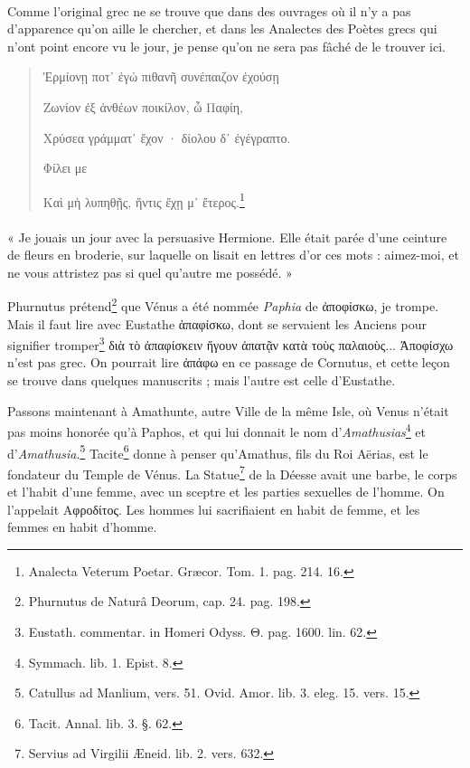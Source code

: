 \documentclass[a4paper, 11pt, oneside, polutonikogreek, french]{article}
\begin{document}
\paragraph{}
Comme l'original grec ne se trouve que dans des ouvrages où il n'y a pas d'apparence qu'on aille le chercher, et dans les Analectes des Poètes grecs qui n'ont point encore vu le jour, je pense qu'on ne sera pas fâché de le trouver ici.
\begin{quotation}
Ἑρμίονῃ ποτ᾿ ἐγώ πιθανῆ συνέπαιζον ἐχούσῃ

\hspace*{5mm}Ζωνίον ἐξ ἀνθέων ποικίλον, ὦ Παφίη,

Χρύσεα γράμματ᾽ ἔχον · δίολου δ᾽ ἐγέγραπτο.

\hspace*{5mm}Φίλει με

\hspace*{5mm}Καὶ μὴ λυπηθῇς, ἥντις ἔχῃ μ᾿ ἕτερος.\footnote{Analecta Veterum Poetar. Græcor. Tom. 1. pag. 214. 16.}
\end{quotation}
\paragraph{}

« Je jouais un jour avec la persuasive Hermione. Elle était parée d'une ceinture de fleurs en broderie, sur laquelle on lisait en lettres d'or ces mots : aimez-moi, et ne vous attristez pas si quel qu'autre me possédé. »

Phurnutus prétend\footnote{Phurnutus de Naturâ Deorum, cap. 24. pag. 198.} que Vénus a été nommée \emph{Paphia} de ἀποφίσκω, je trompe. Mais il faut lire avec Eustathe ἀπαφίσκω, dont se servaient les Anciens pour signifier tromper\footnote{Eustath. commentar. in Homeri Odyss. Θ. pag. 1600. lin. 62.} διὰ τὸ ἀπαφίσκειν ἤγουν ἀπατᾷν κατὰ τοὺς παλαιοὺς... Ἀποφίσχω n'est pas grec. On pourrait lire ἀπάφω en ce passage de Cornutus, et cette leçon se trouve dans quelques manuscrits ; mais l'autre est celle d'Eustathe.

Passons maintenant à Amathunte, autre Ville de la même Isle, où Venus n'était pas moins honorée qu'à Paphos, et qui lui donnait le nom d'\emph{Amathusias}\footnote{Symmach. lib. 1. Epist. 8.} et d'\emph{Amathusia}.\footnote{Catullus ad Manlium, vers. 51. Ovid. Amor. lib. 3. eleg. 15. vers. 15.} Tacite\footnote{Tacit. Annal. lib. 3. §. 62.} donne à penser qu'Amathus, fils du Roi Aërias, est le fondateur du Temple de Vénus. La Statue\footnote{Servius ad Virgilii Æneid. lib. 2. vers. 632.} de la Déesse avait une barbe, le corps et l'habit d'une femme, avec un sceptre et les parties sexuelles de l'homme. On l'appelait Αφροδίτος. Les hommes lui sacrifiaient en habit de femme, et les femmes en habit d'homme.
\end{document}
